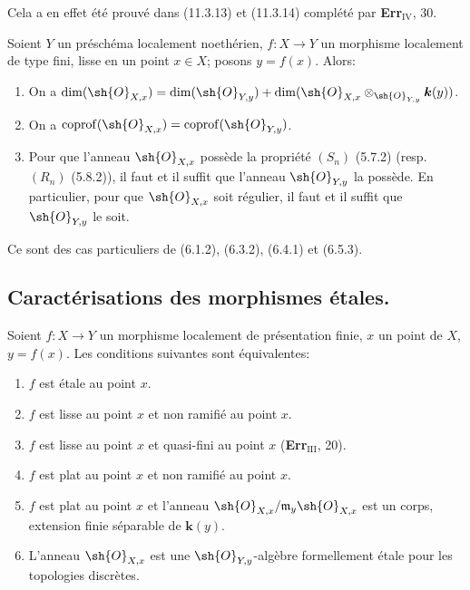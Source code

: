 Cela a en effet été prouvé dans (11.3.13) et (11.3.14) complété par \textbf{Err}$_{\mathrm{IV}}$, 30.

\begin{proposition}[17.5.8]
\label{IV.17.5.8}
Soient $Y$ un préschéma localement noethérien, $f:X\to Y$ un morphisme localement de type fini, lisse en un point $x\in X$; posons $y=f(x)$. Alors:
\begin{enumerate}
  \item[\textup{(i)}] On a $\dim(\sh{O}_{X,x})=\dim(\sh{O}_{Y,y})+\dim(\sh{O}_{X,x}\otimes_{\sh{O}_{Y,y}}\boldsymbol{k}(y))$.
  \item[\textup{(ii)}] On a $\operatorname{coprof}(\sh{O}_{X,x})=\operatorname{coprof}(\sh{O}_{Y,y})$.
  \item[\textup{(iii)}] Pour que l'anneau $\sh{O}_{X,x}$ possède la propriété $(S_n)$ \textup{(5.7.2) (resp.}\ $(R_n)$ \textup{(5.8.2))}, il faut et il suffit que l'anneau $\sh{O}_{Y,y}$ la possède. En particulier, pour que $\sh{O}_{X,x}$ soit régulier, il faut et il suffit que $\sh{O}_{Y,y}$ le soit.
\end{enumerate}
\end{proposition}

Ce sont des cas particuliers de (6.1.2), (6.3.2), (6.4.1) et (6.5.3).

\subsection{Caractérisations des morphismes étales.}

\begin{theorem}[17.6.1]
\label{IV.17.6.1}
Soient $f:X\to Y$ un morphisme localement de présentation finie, $x$ un point de $X$, $y=f(x)$. Les conditions suivantes sont équivalentes:
\begin{enumerate}
  \item[\textup{a)}] $f$ est étale au point $x$.
  \item[\textup{a$'$)}] $f$ est lisse au point $x$ et non ramifié au point $x$.
  \item[\textup{b)}] $f$ est lisse au point $x$ et quasi-fini au point $x$ \textup{(\textbf{Err}$_{\mathrm{III}}$, 20)}.
  \item[\textup{c)}] $f$ est plat au point $x$ et non ramifié au point $x$.
  \item[\textup{c$'$)}] $f$ est plat au point $x$ et l'anneau $\sh{O}_{X,x}/\mathfrak m_y\sh{O}_{X,x}$ est un corps, extension finie séparable de $\boldsymbol{k}(y)$.
  \item[\textup{d)}] L'anneau $\sh{O}_{X,x}$ est une $\sh{O}_{Y,y}$-algèbre formellement étale pour les topologies discrètes.
\end{enumerate}
\end{theorem}

